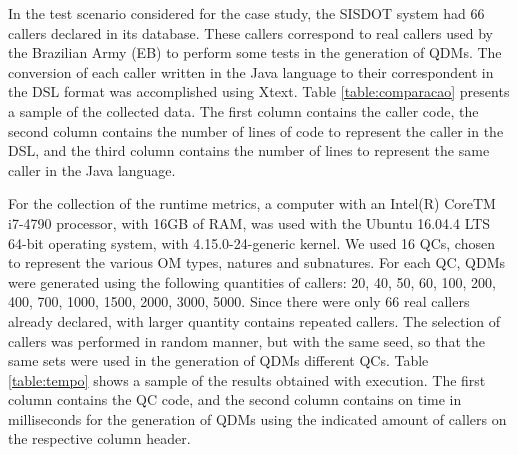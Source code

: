 In the test scenario considered for the case study, the SISDOT system had 66 callers declared in its database. These callers correspond to real callers used by the Brazilian Army (EB) to perform some tests in the generation of QDMs. The conversion of each caller written in the Java language to their correspondent in the DSL format was accomplished using Xtext. Table \ref{table:comparacao} presents a sample of the collected data. The first column contains the caller code, the second column contains the number of lines of code to represent the caller in the DSL, and the third column contains the number of lines to represent the same caller in the Java language.


For the collection of the runtime metrics, a computer with an Intel(R) Core{TM} i7-4790 processor, with 16GB of RAM, was used with the Ubuntu 16.04.4 LTS 64-bit operating system, with 4.15.0-24-generic kernel. We used 16 QCs, chosen to represent the various OM types, natures and subnatures. For each QC, QDMs were generated using the following quantities of callers: 20, 40, 50, 60, 100, 200, 400, 700, 1000, 1500, 2000, 3000, 5000. Since there were only 66 real callers already declared, with larger quantity contains repeated callers. The selection of callers was performed in random manner, but with the same seed, so that the same sets were used in the generation of QDMs different QCs. Table \ref{table:tempo} shows a sample of the results obtained with execution. The first column contains the QC code, and the second column contains on time in milliseconds for the generation of QDMs using the indicated amount of callers on the respective column header.

